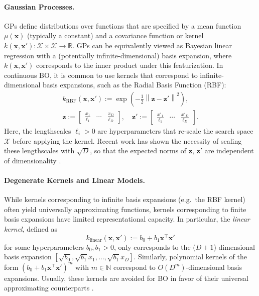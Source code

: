 \documentclass[twoside]{article}
\theoremstyle{plain}
\theoremstyle{definition}
\begin{document}
\paragraph{Gaussian Processes.}
GPs define distributions over functions that are specified by a mean function \(\mu(\mathbf{x})\) (typically a constant) and a covariance function or kernel \(k(\mathbf{x}, \mathbf{x'}) : \mathcal{X} \times \mathcal{X} \rightarrow \mathbb{R}\).
GPs can be equivalently viewed as Bayesian linear regression with a (potentially infinite-dimensional) basis expansion, where \(k(\mathbf{x}, \mathbf{x'})\) corresponds to the inner product under this featurization.
In continuous BO, it is common to use kernels that correspond to infinite-dimensional basis expansions, such as the Radial Basis Function (RBF):
\begin{gather*}
    k_\textrm{RBF}(\mathbf{x}, \mathbf{x}') := \exp\left(-\tfrac{1}{2} \left\lVert \mathbf{z} - \mathbf{z'} \right\rVert^2\right), \\
    \mathbf{z} := \begin{bmatrix} \tfrac{x_1}{\ell_1} & \cdots  & \tfrac{x_D}{\ell_D} \end{bmatrix}, \quad
    \mathbf{z'} := \begin{bmatrix} \tfrac{x'_1}{\ell_1} & \cdots  & \tfrac{x'_D}{\ell_D} \end{bmatrix}.
\end{gather*}
Here, the lengthscales \(\ell_i > 0\) are hyperparameters that re-scale the search space \(\mathcal{X}\) before applying the kernel. Recent work has shown the necessity of scaling these lengthscales with \(\sqrt{D}\), so that the expected norms of $\mathbf z$, $\mathbf z'$ are independent of dimensionality \citep{hvarfner2024vanilla, xu2025standard, papenmeier2025understanding}.

\paragraph{Degenerate Kernels and Linear Models.} While kernels corresponding to infinite basis expansions (e.g.\ the RBF kernel) often yield universally approximating functions, kernels corresponding to finite basis expansions have limited representational capacity.
In particular, the \emph{linear kernel}, defined as
\begin{equation}
     k_\mathrm{linear}(\mathbf{x}, \mathbf{x}') := b_0 + b_1 \mathbf{x}^\top \mathbf{x'}
     \label{eqn:std_linear_kernel}
\end{equation}
for some hyperparameters $b_0, b_1 > 0$, only corresponds to the ($D+1$)-dimensional basis expansion $[\sqrt{b_0}, \sqrt{b_1} x_1, \ldots, \sqrt{b_1} x_D]$. Similarly, polynomial kernels of the form $\left( b_0 + b_1 \mathbf{x}^\top \mathbf{x'} \right)^m$ with $m \in \mathbb N$
correspond to $O(D^m)$-dimensional basis expansions.
Usually, these kernels are avoided for BO in favor of their universal approximating counterparts \citep{garnett2023bayesian}.
\end{document}
